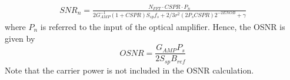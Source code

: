 \documentclass[a4paper]{article}
\begin{document}
\begin{align}
SNR_n = \frac{N_{FFT}\cdot CSPR\cdot P_n}{2G_{AMP}^{-1}(1 + CSPR)S_{sp}f_s + 2/3r^2(2P_sCSPR)2^{-2ENOB} + \gamma}
\end{align}
where $P_n$ is referred to the input of the optical amplifier. Hence, the OSNR is given by
\begin{equation}
OSNR = \frac{G_{AMP}P_s}{2S_{sp}B_{ref}}
\end{equation}
Note that the carrier power is not included in the OSNR calculation.



\end{document}

